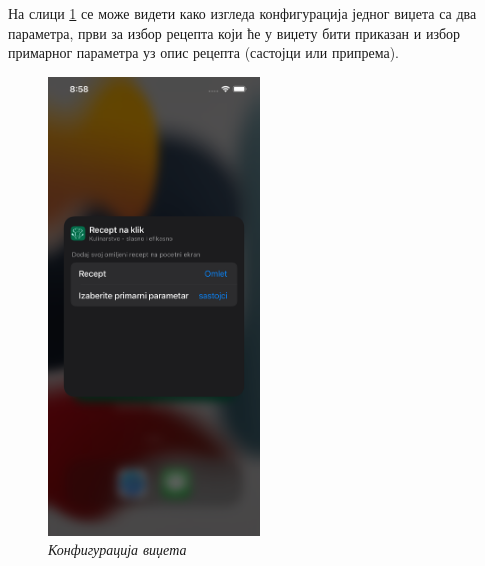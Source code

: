\documentclass[12pt,oneside]{memoir}
\begin{document}
\indent На слици \ref{slika:widget_configuration} се може видети како изгледа конфигурација једног виџета са два параметра, први за избор рецепта који ће у виџету бити приказан и избор примарног параметра уз опис рецепта (састојци или припрема).

\begin{figure}[H]
\includegraphics[width=0.5\textwidth]{images/Widget_configuration.png}
\centering
\caption{\textit{Конфигурација виџета}}
\label{slika:widget_configuration}
\end{figure}
\end{document}

